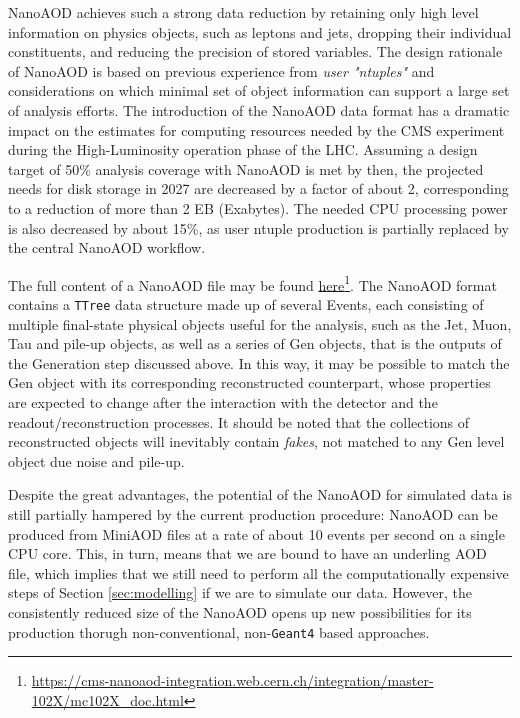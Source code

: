 NanoAOD achieves such a strong data reduction by retaining only high level information on physics objects, such as leptons and jets, dropping their individual constituents, and reducing the precision of stored variables.
The design rationale of NanoAOD is based on previous experience from \emph{user "ntuples"} and considerations on which minimal set of object information can support a large set of analysis efforts. The introduction of the NanoAOD data format has a dramatic impact on the estimates for computing resources needed by the CMS experiment during the High-Luminosity operation phase of the LHC. Assuming a design target of 50$\%$ analysis coverage with NanoAOD is met by then, the projected needs for disk storage in 2027 are decreased by a factor of about 2, corresponding to a reduction of more than 2 EB (Exabytes). The needed CPU processing power is also decreased by about 15$\%$, as user ntuple production is partially replaced by the central NanoAOD workflow. 

The full content of a NanoAOD file may be found \href{https://cms-nanoaod-integration.web.cern.ch/integration/master-102X/mc102X_doc.html}{here}\footnote{\url{https://cms-nanoaod-integration.web.cern.ch/integration/master-102X/mc102X_doc.html}}. The NanoAOD format contains a \texttt{TTree} data structure made up of several Events, each consisting of multiple final-state physical objects useful for the analysis, such as the Jet, Muon, Tau and pile-up objects, as well as a series of Gen objects, that is the outputs of the Generation step discussed above. In this way, it may be possible to match the Gen object with its corresponding reconstructed counterpart, whose properties are expected to change after the interaction with the detector and the readout/reconstruction processes. It should be noted that the collections of reconstructed objects will inevitably contain \emph{fakes}, not matched to any Gen level object due noise and pile-up.

Despite the great advantages, the potential of the NanoAOD for simulated data is still partially hampered by the current production procedure: NanoAOD can be produced from MiniAOD files at a rate of about 10 events per second on a
single CPU core. This, in turn, means that we are bound to have an underling AOD file, which implies that we still need to perform all the computationally expensive steps of Section \ref{sec:modelling} if we are to simulate our data.
However, the consistently reduced size of the NanoAOD opens up new possibilities for its production thorugh non-conventional, non-\texttt{Geant4} based approaches. 

